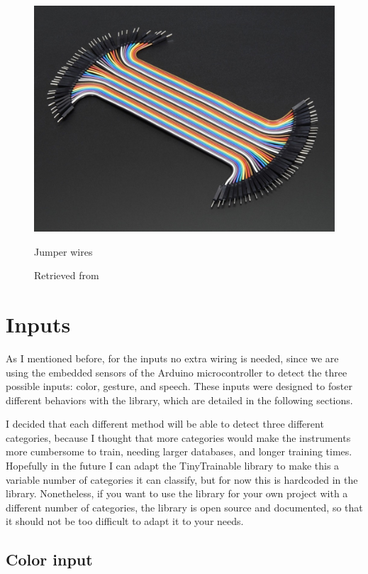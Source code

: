 \begin{figure}[ht]
  \centering
  \includegraphics[width=0.75\linewidth,height=0.25\textheight,keepaspectratio]{images/materials-adafruit-jumper-wires.jpg}
  \caption{Jumper wires}
  \caption*{Retrieved from \cite{website-materials-adafruit-jumper-wires}}
  \label{fig:materials-adafruit-jumper-wires}
\end{figure}

\section{Inputs}

As I mentioned before, for the inputs no extra wiring is needed, since we are using the embedded sensors of the Arduino microcontroller to detect the three possible inputs: color, gesture, and speech. These inputs were designed to foster different behaviors with the library, which are detailed in the following sections.

I decided that each different method will be able to detect three different categories, because I thought that more categories would make the instruments more cumbersome to train, needing larger databases, and longer training times. Hopefully in the future I can adapt the TinyTrainable library to make this a variable number of categories it can classify, but for now this is hardcoded in the library. Nonetheless, if you want to use the library for your own project with a different number of categories, the library is open source and documented, so that it should not be too difficult to adapt it to your needs.

\subsection{Color input}

